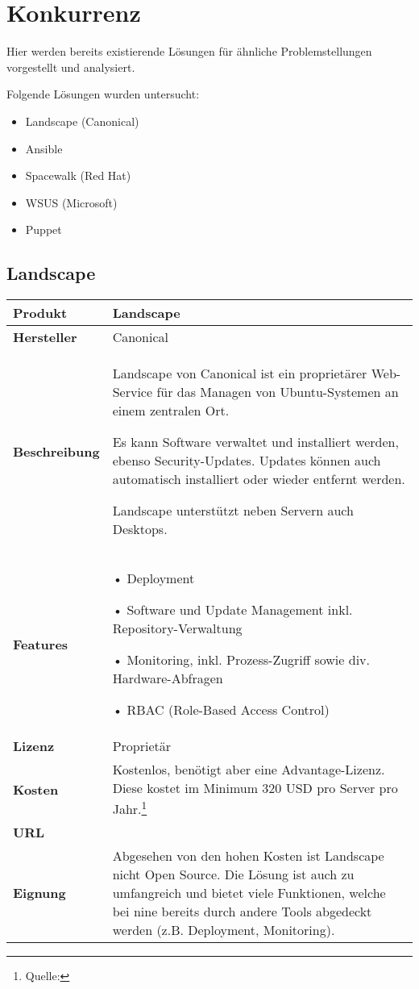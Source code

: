 \section{Konkurrenz} \label{sec:analysis:competition}

Hier werden bereits existierende Lösungen für ähnliche Problemstellungen vorgestellt und analysiert.

Folgende Lösungen wurden untersucht:
\begin{itemize}
\item Landscape (Canonical)
\item Ansible
\item Spacewalk (Red Hat)
\item WSUS (Microsoft)
\item Puppet
\end{itemize}

\newcommand{\competitor}[8]{
	\begin{tabularx}{\linewidth}{lX}
		\toprule
		\textbf{Produkt} & #1\\
		\midrule
		\textbf{Hersteller} & #2\\
		\textbf{Beschreibung} & #3\\
		\textbf{Features} & #4\\
        \textbf{Lizenz} & #5\\
		\textbf{Kosten} & #6\\
        \textbf{URL} & #7\\
        \textbf{Eignung} & #8\\
		\bottomrule
	\end{tabularx}
}

\subsection*{Landscape} \label{sec:analysis:competition:landscape}

\competitor{Landscape}
{Canonical}
{Landscape von Canonical ist ein proprietärer Web-Service für das Managen von Ubuntu-Systemen an einem zentralen Ort.

Es kann Software verwaltet und installiert werden, ebenso Security-Updates. Updates können auch automatisch installiert oder wieder entfernt werden.

Landscape unterstützt neben Servern auch Desktops.}
{
• Deployment

• Software und Update Management inkl. Repository-Verwaltung

• Monitoring, inkl. Prozess-Zugriff sowie div. Hardware-Abfragen

• RBAC (Role-Based Access Control)
}
{Proprietär}
{Kostenlos, benötigt aber eine Advantage-Lizenz. Diese kostet im Minimum 320 USD pro Server pro Jahr.\footnote{Quelle: \purl{http://www.ubuntu.com/management/ubuntu-advantage}}}
{\purl{https://landscape.canonical.com/}}
{Abgesehen von den hohen Kosten ist Landscape nicht Open Source. Die Lösung ist auch zu umfangreich und bietet viele Funktionen, welche bei \gls{nine} bereits durch andere Tools abgedeckt werden (z.B. Deployment, Monitoring).}

